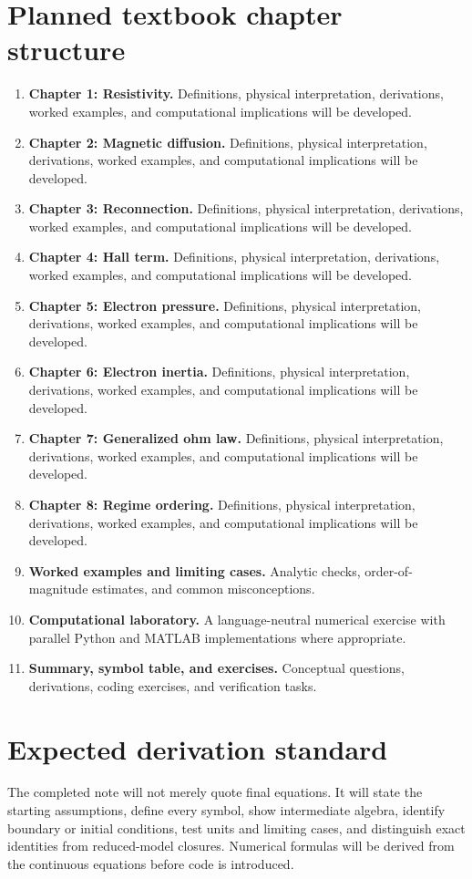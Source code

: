 \documentclass[11pt]{article}
\begin{document}
\section{Planned textbook chapter structure}
\begin{enumerate}[leftmargin=1.8em]
\item \textbf{Chapter 1: Resistivity.} Definitions, physical interpretation, derivations, worked examples, and computational implications will be developed.
\item \textbf{Chapter 2: Magnetic diffusion.} Definitions, physical interpretation, derivations, worked examples, and computational implications will be developed.
\item \textbf{Chapter 3: Reconnection.} Definitions, physical interpretation, derivations, worked examples, and computational implications will be developed.
\item \textbf{Chapter 4: Hall term.} Definitions, physical interpretation, derivations, worked examples, and computational implications will be developed.
\item \textbf{Chapter 5: Electron pressure.} Definitions, physical interpretation, derivations, worked examples, and computational implications will be developed.
\item \textbf{Chapter 6: Electron inertia.} Definitions, physical interpretation, derivations, worked examples, and computational implications will be developed.
\item \textbf{Chapter 7: Generalized ohm law.} Definitions, physical interpretation, derivations, worked examples, and computational implications will be developed.
\item \textbf{Chapter 8: Regime ordering.} Definitions, physical interpretation, derivations, worked examples, and computational implications will be developed.
\item \textbf{Worked examples and limiting cases.} Analytic checks, order-of-magnitude estimates, and common misconceptions.
\item \textbf{Computational laboratory.} A language-neutral numerical exercise with parallel Python and MATLAB implementations where appropriate.
\item \textbf{Summary, symbol table, and exercises.} Conceptual questions, derivations, coding exercises, and verification tasks.
\end{enumerate}

\section{Expected derivation standard}
The completed note will not merely quote final equations. It will state the starting assumptions, define every symbol, show intermediate algebra, identify boundary or initial conditions, test units and limiting cases, and distinguish exact identities from reduced-model closures. Numerical formulas will be derived from the continuous equations before code is introduced.
\end{document}
